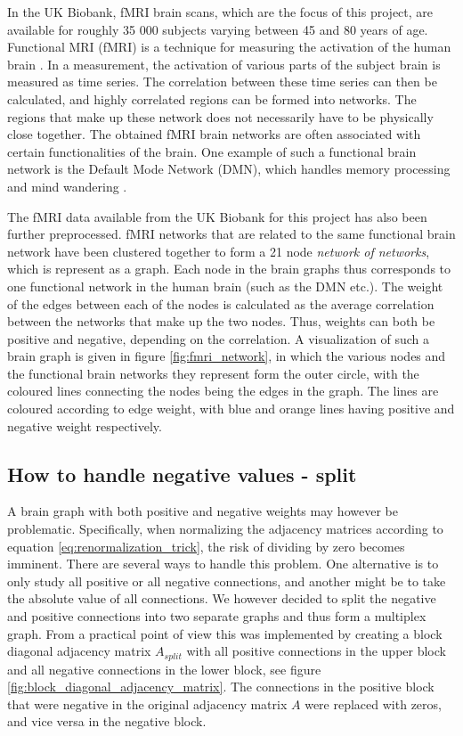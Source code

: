 In the UK Biobank, fMRI brain scans, which are the focus of this project, are available for roughly 35 000 subjects varying between 45 and 80 years of age. Functional MRI (fMRI) is a technique for measuring the activation of the human brain \cite{sporns}. In a measurement, the activation of various parts of the subject brain is measured as time series. The correlation between these time series can then be calculated, and highly correlated regions can be formed into networks. The regions that make up these network does not necessarily have to be physically close together. The obtained fMRI brain networks are often associated with certain functionalities of the brain. One example of such a functional brain network is the Default Mode Network (DMN), which handles memory processing and mind wandering \cite{alves_dmn}. 

The fMRI data available from the UK Biobank for this project has also been further preprocessed. fMRI networks that are related to the same functional brain network have been clustered together to form a 21 node \textit{network of networks}, which is represent as a graph. Each node in the brain graphs thus corresponds to one functional network in the human brain (such as the DMN etc.). The weight of the edges between each of the nodes is calculated as the average correlation between the networks that make up the two nodes. Thus, weights can both be positive and negative, depending on the correlation. A visualization of such a brain graph is given in figure \ref{fig:fmri_network}, in which the various nodes and the functional brain networks they represent form the outer circle, with the coloured lines connecting the nodes being the edges in the graph. The lines are coloured according to edge weight, with blue and orange lines having positive and negative weight respectively.

\subsection{How to handle negative values - split}

A brain graph with both positive and negative weights may however be problematic. Specifically, when normalizing the adjacency matrices according to equation \eqref{eq:renormalization_trick}, the risk of dividing by zero becomes imminent. There are several ways to handle this problem. One alternative is to only study all positive or all negative connections, and another might be to take the absolute value of all connections. We however decided to split the negative and positive connections into two separate graphs and thus form a multiplex graph. From a practical point of view this was implemented by creating a block diagonal adjacency matrix $A_{split}$ with all positive connections in the upper block and all negative connections in the lower block, see figure \ref{fig:block_diagonal_adjacency_matrix}. The connections in the positive block that were negative in the original adjacency matrix $A$ were replaced with zeros, and vice versa in the negative block.

